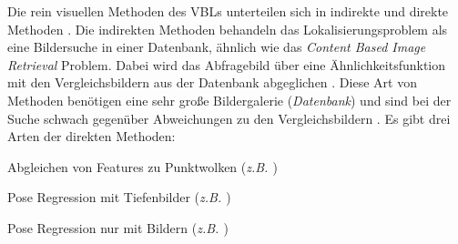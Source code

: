 Die rein visuellen Methoden des VBLs unterteilen sich in indirekte und direkte Methoden \cite{lowryVisualPlaceRecognition2016}. Die indirekten Methoden behandeln das Lokalisierungsproblem als eine Bildersuche in einer Datenbank, ähnlich wie das \textit{Content Based Image Retrieval} \cite{lewContentbasedMultimediaInformation2006} Problem. Dabei wird das Abfragebild über eine Ähnlichkeitsfunktion mit den Vergleichsbildern aus der Datenbank abgeglichen \cite{zhangImageBasedLocalization2006, arandjelovicThreeThingsEveryone2012, radenovicCNNImageRetrieval2016}. Diese Art von Methoden benötigen eine sehr große Bildergalerie (\textit{Datenbank}) und sind bei der Suche schwach gegenüber Abweichungen zu den Vergleichsbildern \cite{lowryVisualPlaceRecognition2016}. Es gibt drei Arten der direkten Methoden: 
\begin{enumerate*}[label=\arabic*)]
	\item Abgleichen von Features zu Punktwolken (\textit{z.B. \cite{liWorldwidePoseEstimation2012}})
	\item Pose Regression mit Tiefenbilder (\textit{z.B. \cite{shottonSceneCoordinateRegression2013a}})
	\item Pose Regression nur mit Bildern (\textit{z.B. \cite{kendallPoseNetConvolutionalNetwork2015}})
\end{enumerate*}

